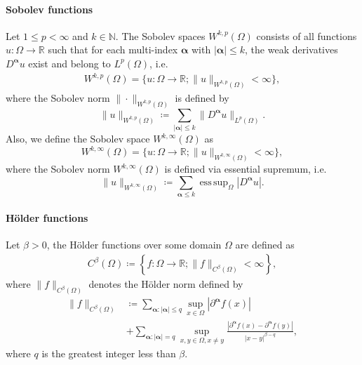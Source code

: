 \documentclass{article}
\DeclareMathOperator*{\esssup}{ess\,sup}
\newcommand{\R}{\mathbb{R}}
\theoremstyle{plain}
\theoremstyle{definition}
\theoremstyle{remark}
\begin{document}
\paragraph{Sobolev functions}
Let $1 \leq p < \infty$ and $k \in \mathbb{N}$. The Sobolev spaces $W^{k, p}(\Omega)$ consists of all functions $u: \Omega \to \R$ such that for each multi-index $\bm{\alpha}$ with $|\bm{\alpha}| \leq k$, the weak derivatives $D^{\bm{\alpha}} u$ exist and belong to $L^p(\Omega)$, i.e. 
\begin{equation*}
    \begin{aligned}
        W^{k, p}(\Omega) = \{u: \Omega \to \R; \|u\|_{W^{k, p}(\Omega)} < \infty\},
    \end{aligned}
\end{equation*}
where the Sobolev norm $\|\cdot\|_{W^{k, p}(\Omega)}$ is defined by
\begin{equation*}
    \|u\|_{W^{k, p}(\Omega)} \coloneqq \sum_{|\bm{\alpha}| \leq k } \|D^{\bm{\alpha}} u\|_{L^p(\Omega)}.
\end{equation*}
Also, we define the Sobolev space $W^{k, \infty}(\Omega)$ as 
\begin{equation*}
    W^{k, \infty} (\Omega) = \{u: \Omega \to \R; \|u\|_{W^{k, \infty}(\Omega)} < \infty\},
\end{equation*}
where the Sobolev norm $W^{k, \infty}(\Omega)$ is defined via essential supremum, i.e. 
\begin{equation*}
    \|u\|_{W^{k, \infty}(\Omega)} \coloneqq \sum_{\bm{\alpha} \leq k} \esssup_\Omega |D^{\bm{\alpha}} u|. 
\end{equation*}

\paragraph{Hölder functions} Let $\beta > 0$, the Hölder functions over some domain $\Omega$ are defined as
\begin{align*}
    C^{\beta} (\Omega) \coloneqq  \left\{f: \Omega \to \R; \|f\|_{C^{\beta} (\Omega)} < \infty \right\},
\end{align*}
where $\|f\|_{C^{\beta} (\Omega)}$ denotes the Hölder norm defined by
\begin{align*}
    \|f\|_{C^{\beta} (\Omega)} & \coloneqq \sum_{\bm{\alpha}: |\bm{\alpha}| \leq q} \sup_{x \in \Omega} |\partial^{\bm{\alpha}} f(x)| \\  & +  \sum_{\bm{\alpha}: |\bm{\alpha}| = q} \sup_{x, y \in \Omega, x \neq y} \frac{|\partial^{\bm{\alpha}} f(x) - \partial^{\bm{\alpha}} f(y)|}{|x - y|^{\beta-q}},
\end{align*}
where $q$ is the greatest integer less than $\beta$.
\end{document}
